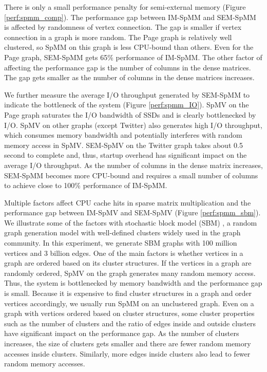 There is only a small performance penalty for semi-external memory (Figure
\ref{perf:spmm_comp}). The performance gap between IM-SpMM and SEM-SpMM
is affected by randomness of vertex connection. The gap is smaller if
vertex connection in a graph is more random. The Page graph is relatively
well clustered, so SpMM on this graph is less CPU-bound than others.
Even for the Page graph, SEM-SpMM gets 65\% performance of IM-SpMM.
The other factor of affecting the performance gap is the number of columns
in the dense matrices. The gap gets smaller as the number of columns in
the dense matrices increases.

We further measure the average I/O throughput generated by SEM-SpMM to indicate
the bottleneck of the system (Figure \ref{perf:spmm_IO}). SpMV on the Page
graph saturates the I/O bandwidth of SSDs and is clearly bottlenecked by I/O.
SpMV on other graphs (except Twitter) also generates high I/O throughput,
which consumes memory bandwidth and potentially interferes with random memory
access in SpMV. SEM-SpMV on the Twitter graph takes about 0.5 second to
complete and,
thus, startup overhead has significant impact on the average I/O throughput.
As the number of columns in the dense matrix increases, SEM-SpMM becomes more
CPU-bound and requires a small number of columns to achieve close to 100\%
performance of IM-SpMM.

Multiple factors affect CPU cache hits in sparse matrix multiplication and
the performance gap between IM-SpMV and SEM-SpMV (Figure \ref{perf:spmm_sbm}).
We illustrate some of the factors with stochastic block model (SBM)
\cite{sussman12}, a random graph generation model with well-defined clusters
widely used in the graph community. In this experiment, we
generate SBM graphs with 100 million vertices and 3 billion edges.
One of the main factors is whether vertices in a graph are ordered
based on its cluster structures. If the vertices in a graph are randomly ordered,
SpMV on the graph generates many random memory access. Thus, the system is
bottlenecked by memory bandwidth and the performance gap is small. Because it
is expensive to find cluster structures in a graph and order vertices accordingly,
we usually run
SpMM on an unclustered graph. Even on a graph with vertices ordered based on
cluster structures, some cluster properties such as the number of clusters and
the ratio of edges inside and outside clusters have significant impact on
the performance gap.
As the number of clusters increases, the size of clusters gets smaller and
there are fewer random memory accesses inside clusters. Similarly, more
edges inside clusters also lead to fewer random memory accesses.

